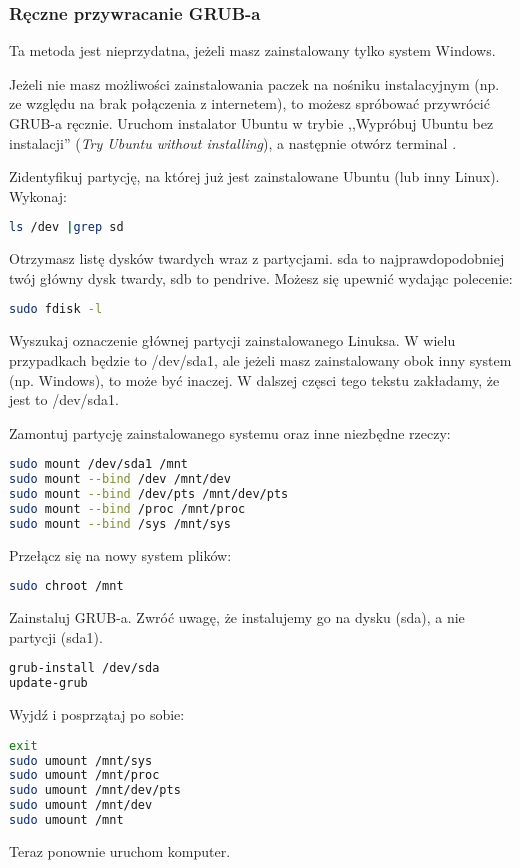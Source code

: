 \subsubsection{Ręczne przywracanie GRUB-a}
Ta metoda jest nieprzydatna, jeżeli masz zainstalowany tylko system Windows.

Jeżeli nie masz możliwości zainstalowania paczek na nośniku instalacyjnym (np. ze względu na brak połączenia z internetem), to możesz spróbować przywrócić GRUB-a ręcznie. Uruchom instalator Ubuntu w trybie ,,Wypróbuj Ubuntu bez instalacji'' (\textit{Try Ubuntu without installing}), a następnie otwórz terminal .

Zidentyfikuj partycję, na której już jest zainstalowane Ubuntu (lub inny Linux). Wykonaj:

\begin{lstlisting}[language=bash]
ls /dev |grep sd
\end{lstlisting}

Otrzymasz listę dysków twardych wraz z partycjami. \textcolor{ubuntu_orange}{sda} to najprawdopodobniej twój główny dysk twardy, sdb to pendrive. Możesz się upewnić wydając polecenie:

\begin{lstlisting}[language=bash]
sudo fdisk -l
\end{lstlisting}

Wyszukaj oznaczenie głównej partycji zainstalowanego Linuksa. W wielu przypadkach będzie to /dev/sda1, ale jeżeli masz zainstalowany obok inny system (np. Windows), to może być inaczej. W dalszej częsci tego tekstu zakładamy, że jest to /dev/sda1.

Zamontuj partycję zainstalowanego systemu oraz inne niezbędne rzeczy:
\begin{lstlisting}[language=bash]
sudo mount /dev/sda1 /mnt
sudo mount --bind /dev /mnt/dev
sudo mount --bind /dev/pts /mnt/dev/pts
sudo mount --bind /proc /mnt/proc
sudo mount --bind /sys /mnt/sys
\end{lstlisting}

Przełącz się na nowy system plików:

\begin{lstlisting}[language=bash]
sudo chroot /mnt
\end{lstlisting}

Zainstaluj GRUB-a. Zwróć uwagę, że instalujemy go na dysku (sda), a nie partycji (sda1).

\begin{lstlisting}[language=bash]
grub-install /dev/sda
update-grub
\end{lstlisting}

Wyjdź i posprzątaj po sobie:

\begin{lstlisting}[language=bash]
exit
sudo umount /mnt/sys
sudo umount /mnt/proc
sudo umount /mnt/dev/pts
sudo umount /mnt/dev
sudo umount /mnt
\end{lstlisting}

Teraz ponownie uruchom komputer.
\clearpage
